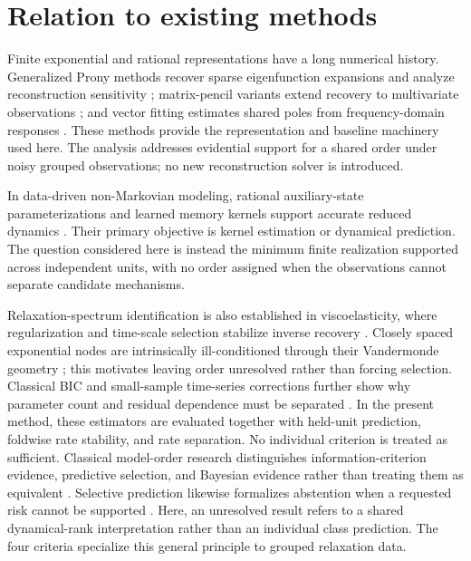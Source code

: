 \documentclass[11pt]{article}
\begin{document}
\section{Relation to existing methods}
Finite exponential and rational representations have a long numerical history. Generalized Prony methods recover sparse eigenfunction expansions and analyze reconstruction sensitivity \cite{stampfer2020gop}; matrix-pencil variants extend recovery to multivariate observations \cite{bosner2021parallel}; and vector fitting estimates shared poles from frequency-domain responses \cite{gustavsen1999vector}. These methods provide the representation and baseline machinery used here. The analysis addresses evidential support for a shared order under noisy grouped observations; no new reconstruction solver is introduced.

In data-driven non-Markovian modeling, rational auxiliary-state parameterizations and learned memory kernels support accurate reduced dynamics \cite{lei2016parameterization,ge2024state,lang2026learning}. Their primary objective is kernel estimation or dynamical prediction. The question considered here is instead the minimum finite realization supported across independent units, with no order assigned when the observations cannot separate candidate mechanisms.

Relaxation-spectrum identification is also established in viscoelasticity, where regularization and time-scale selection stabilize inverse recovery \cite{stankiewicz2023relaxation}. Closely spaced exponential nodes are intrinsically ill-conditioned through their Vandermonde geometry \cite{moitra2015superresolution}; this motivates leaving order unresolved rather than forcing selection. Classical BIC and small-sample time-series corrections further show why parameter count and residual dependence must be separated \cite{schwarz1978bic,hurvich1989timeseries}. In the present method, these estimators are evaluated together with held-unit prediction, foldwise rate stability, and rate separation. No individual criterion is treated as sufficient.
Classical model-order research distinguishes information-criterion evidence, predictive selection, and Bayesian evidence rather than treating them as equivalent \cite{stoica2004modelorder,shao1993crossvalidation,kass1995bayes}. Selective prediction likewise formalizes abstention when a requested risk cannot be supported \cite{geifman2017selective}. Here, an unresolved result refers to a shared dynamical-rank interpretation rather than an individual class prediction. The four criteria specialize this general principle to grouped relaxation data.
\end{document}
